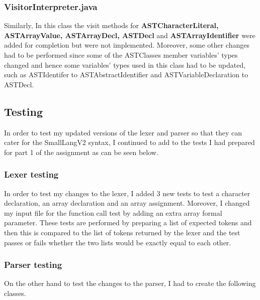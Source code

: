 \documentclass{article}
\begin{document}
								\subsubsection{VisitorInterpreter.java}
				
				Similarly, In this class the visit methods for \textbf{ASTCharacterLiteral, ASTArrayValue, ASTArrayDecl, ASTDecl} and \textbf{ASTArrayIdentifier} were added for completion but were not implemented. Moreover, some other changes had to be performed since some of the ASTClasses member variables' types changed and hence some variables' types used in this class had to be updated, such as ASTIdentifer to ASTAbstractIdentifier and ASTVariableDeclaration to ASTDecl.
				
				\subsection{Testing}
				
				In order to test my updated versions of the lexer and parser so that they can cater for the SmallLangV2 syntax, I continued to add to the tests I had prepared for part 1 of the assignment as can be seen below.
				
				\subsubsection{Lexer testing}
				
				In order to test my changes to the lexer, I added 3 new tests to test a character declaration, an array declaration and an array assignment. Moreover, I changed my input file for the function call test by adding an extra array formal parameter. These tests are performed by preparing a list of expected tokens and then this is compared to the list of tokens returned by the lexer and the test passes or fails whether the two lists would be exactly equal to each other.
				
				\subsubsection{Parser testing}
				
				On the other hand to test the changes to the parser, I had to create the following classes.
				
\end{document}
